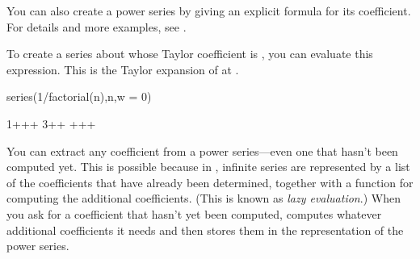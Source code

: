 {{{{{{{{{{{{{{You can also create a power series by giving an explicit formula
for its  coefficient.
For details and more examples, see
.

\begin{xtc}
\begin{xtccomment}
To create a series about
 whose  Taylor coefficient
is , you can evaluate this expression.
This is the Taylor expansion of  at .
\end{xtccomment}
\begin{spadsrc}
series(1/factorial(n),n,w = 0)
\end{spadsrc}
\begin{TeXOutput}
\begin{fricasmath}{8}
1++\TIMES {}+\TIMES \SUPER%
{}{3}+\TIMES {}+\TIMES %
+\TIMES {}+\TIMES {}+%
\end{fricasmath}
\end{TeXOutput}
\end{xtc}
%


You can extract any coefficient from a power series---even one
that hasn't been computed yet.
This is possible because in \Language{}, infinite series are
represented by a list of the coefficients that have already been
determined, together with a function for computing the additional
coefficients.
(This is known as {\it lazy evaluation}.) When you ask for a
coefficient that hasn't yet been computed, \Language{} computes
whatever additional coefficients it needs and then stores them in
the representation of the power series.

}}}}}}}}}}}}}}
